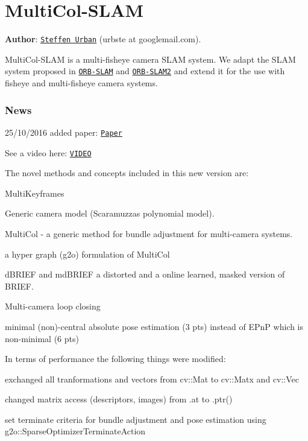 \section*{Multi\+Col-\/\+S\+L\+AM}

{\bfseries Author}\+: \href{http://www.ipf.kit.edu/english/staff_urban_steffen.php}{\tt Steffen Urban} (urbste at googlemail.\+com).

Multi\+Col-\/\+S\+L\+AM is a multi-\/fisheye camera S\+L\+AM system. We adapt the S\+L\+AM system proposed in \href{https://github.com/raulmur/ORB_SLAM}{\tt O\+R\+B-\/\+S\+L\+AM} and \href{https://github.com/raulmur/ORB_SLAM2}{\tt O\+R\+B-\/\+S\+L\+A\+M2} and extend it for the use with fisheye and multi-\/fisheye camera systems.

\subsubsection*{News}


\begin{DoxyItemize}
\item 25/10/2016 added paper\+: \href{https://arxiv.org/abs/1610.07336}{\tt Paper}
\item See a video here\+: \href{https://youtu.be/ggZqsiePUq8}{\tt V\+I\+D\+EO}
\end{DoxyItemize}

The novel methods and concepts included in this new version are\+:


\begin{DoxyItemize}
\item Multi\+Keyframes
\item Generic camera model (Scaramuzza\textquotesingle{}s polynomial model).
\item Multi\+Col -\/ a generic method for bundle adjustment for multi-\/camera systems.
\item a hyper graph (g2o) formulation of Multi\+Col
\item d\+B\+R\+I\+EF and md\+B\+R\+I\+EF a distorted and a online learned, masked version of B\+R\+I\+EF.
\item Multi-\/camera loop closing
\item minimal (non)-\/central absolute pose estimation (3 pts) instead of E\+PnP which is non-\/minimal (6 pts)
\end{DoxyItemize}

In terms of performance the following things were modified\+:
\begin{DoxyItemize}
\item exchanged all tranformations and vectors from cv\+::\+Mat to cv\+::\+Matx and cv\+::\+Vec
\item changed matrix access (descriptors, images) from .at to .ptr()
\item set terminate criteria for bundle adjustment and pose estimation using g2o\+::\+Sparse\+Optimizer\+Terminate\+Action
\end{DoxyItemize}

